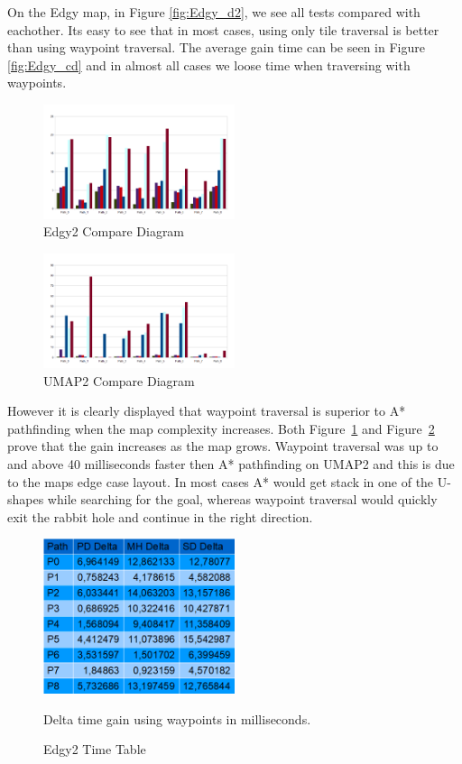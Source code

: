 \documentclass[a4paper]{article}
\begin{document}
On the Edgy map, in Figure \ref{fig:Edgy_d2}, we see all tests compared with eachother. Its easy to see that in most cases, using only tile traversal is better than using waypoint traversal.
The average gain time can be seen in Figure \ref{fig:Edgy_cd} and in almost all cases we loose time when traversing with waypoints.
	
\begin{figure}[h!]
\centering
\includegraphics[width=0.5\textwidth,height=\textheight,keepaspectratio]{ChartsAndFigures/Edgy2_d2.png}
\caption{Edgy2 Compare Diagram}
\label{fig:Edgy2_d2}
\end{figure}

\begin{figure}[h!]
\centering
\includegraphics[width=0.5\textwidth,height=\textheight,keepaspectratio]{ChartsAndFigures/UMAP2_d2.png}
\caption{UMAP2 Compare Diagram}
\label{fig:UMAP2_d2}
\end{figure}

However it is clearly displayed that waypoint traversal is superior to A* pathfinding when the map complexity increases. Both Figure~\ref{fig:Edgy2_d2} and Figure~\ref{fig:UMAP2_d2} prove that the gain increases as the map grows.
Waypoint traversal was up to and above 40 milliseconds faster then A* pathfinding on UMAP2 and this is due to the maps edge case layout. In most cases A* would get stack in one of the U-shapes while searching for the goal, whereas waypoint traversal would quickly exit the rabbit hole and continue in the right direction.

\begin{figure}[h!]
\centering
\includegraphics[width=0.5\textwidth,height=\textheight,keepaspectratio]{ChartsAndFigures/Edgy2_timeTable.png}
\caption{Edgy2 Time Table}
Delta time gain using waypoints in milliseconds.
\label{fig:Edgy2_cd}
\end{figure}
\end{document}
